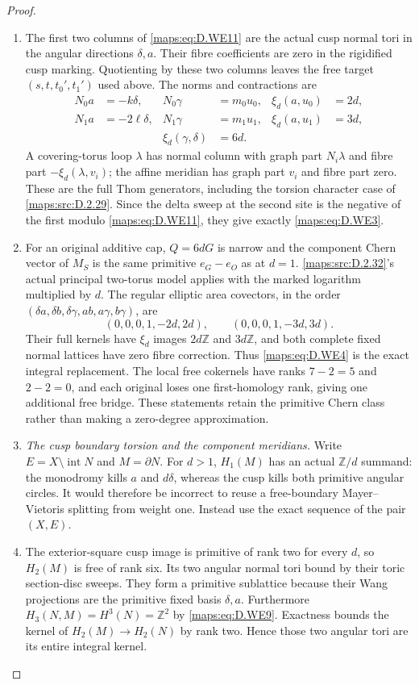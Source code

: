 \begin{proof}
\begin{enumerate}[label=\arabic*.,leftmargin=*]
\item The first two columns of \eqref{maps:eq:D.WE11} are the actual
cusp normal tori in the angular directions
$\delta,a$. Their fibre coefficients are zero in
the rigidified cusp marking. Quotienting by these
two columns leaves the free target
$(s,t,t_0',t_1')$ used above.
The norms and contractions are
\[
\begin{aligned}
 N_0a&=-k\delta,&N_0\gamma&=m_0u_0,&
 \xi_d(a,u_0)&=2d,\\
 N_1a&=-2\ell\delta,&N_1\gamma&=m_1u_1,&
 \xi_d(a,u_1)&=3d,\\
 &&\xi_d(\gamma,\delta)&=6d .
\end{aligned}
\]
A covering-torus loop $\lambda$ has normal column
with graph part $N_i\lambda$ and fibre part
$-\xi_d(\lambda,v_i)$; the affine meridian has
graph part $v_i$ and fibre part zero. These are the
full Thom generators, including the torsion
character case of \ref{maps:src:D.2.29}. Since the delta sweep
at the second site is the negative of the first
modulo \eqref{maps:eq:D.WE11}, they give exactly \eqref{maps:eq:D.WE3}.

\item For an original additive cap, $Q=6dG$ is narrow and
the component Chern vector of $M_S$ is the same
primitive $e_G-e_O$ as at $d=1$. \ref{maps:src:D.2.32}'s actual
principal two-torus model applies with the marked
logarithm multiplied by $d$. The regular elliptic
area covectors, in the order
$(\delta a,\delta b,\delta\gamma,ab,a\gamma,b\gamma)$,
are
\[
 (0,0,0,1,-2d,2d),\qquad
 (0,0,0,1,-3d,3d).
\]
Their full kernels have $\xi_d$ images $2d\mathbb Z$
and $3d\mathbb Z$, and both complete fixed normal
lattices have zero fibre correction. Thus \eqref{maps:eq:D.WE4}
is the exact integral replacement. The local free
cokernels have ranks $7-2=5$ and $2-2=0$, and each
original loses one first-homology rank, giving
one additional free bridge. These statements retain
the primitive Chern class rather than making a
zero-degree approximation.

\item \emph{The cusp boundary torsion and the component meridians.}
Write $E=X\setminus\operatorname{int}N$ and $M=\partial N$.
For $d>1$, $H_1(M)$ has an actual $\mathbb Z/d$ summand:
the monodromy kills $a$ and $d\delta$, whereas the
cusp kills both primitive angular circles. It would
therefore be incorrect to reuse a free-boundary
Mayer--Vietoris splitting from weight one.
Instead use the exact sequence of the pair $(X,E)$.

\item The exterior-square cusp image is primitive of rank
two for every $d$, so $H_2(M)$ is free of rank six.
Its two angular normal tori bound by their toric
section-disc sweeps. They form a primitive sublattice
because their Wang projections are the primitive
fixed basis $\delta,a$.
Furthermore
$H_3(N,M)=H^3(N)=\mathbb Z^2$ by \eqref{maps:eq:D.WE9}.
Exactness bounds the kernel of
$H_2(M)\to H_2(N)$ by rank two. Hence those two
angular tori are its entire integral kernel.


\end{enumerate}
\end{proof}
